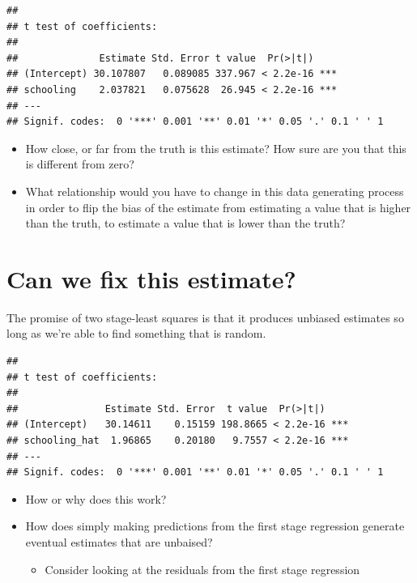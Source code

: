 \documentclass[
]{book}
\providecommand{\tightlist}{%
  \setlength{\itemsep}{0pt}\setlength{\parskip}{0pt}}
\begin{document}
\begin{verbatim}
## 
## t test of coefficients:
## 
##              Estimate Std. Error t value  Pr(>|t|)    
## (Intercept) 30.107807   0.089085 337.967 < 2.2e-16 ***
## schooling    2.037821   0.075628  26.945 < 2.2e-16 ***
## ---
## Signif. codes:  0 '***' 0.001 '**' 0.01 '*' 0.05 '.' 0.1 ' ' 1
\end{verbatim}

\begin{itemize}
\tightlist
\item
  How close, or far from the truth is this estimate? How sure are you
  that this is different from zero?
\item
  What relationship would you have to change in this data generating
  process in order to flip the bias of the estimate from estimating a
  value that is higher than the truth, to estimate a value that is lower
  than the truth?
\end{itemize}

\hypertarget{can-we-fix-this-estimate}{%
\section{Can we fix this estimate?}\label{can-we-fix-this-estimate}}

The promise of two stage-least squares is that it produces unbiased
estimates so long as we're able to find something that is random.

\begin{verbatim}
## 
## t test of coefficients:
## 
##               Estimate Std. Error  t value  Pr(>|t|)    
## (Intercept)   30.14611    0.15159 198.8665 < 2.2e-16 ***
## schooling_hat  1.96865    0.20180   9.7557 < 2.2e-16 ***
## ---
## Signif. codes:  0 '***' 0.001 '**' 0.01 '*' 0.05 '.' 0.1 ' ' 1
\end{verbatim}

\begin{itemize}
\item
  How or why does this work?
\item
  How does simply making predictions from the first stage regression
  generate eventual estimates that are unbaised?

  \begin{itemize}
  \tightlist
  \item
    Consider looking at the residuals from the first stage regression
  \end{itemize}
\end{itemize}
\end{document}
